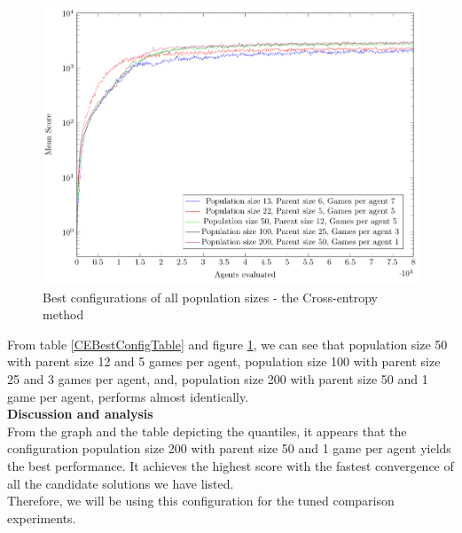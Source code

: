 \begin{figure}[H]
\centering
\includegraphics[scale=0.8]{data/ce_population_offspring/bestofall_population/PlotFile.pdf}
\caption{Best configurations of all population sizes - the Cross-entropy method \label{CEBestConfigPlot}}
\end{figure}

From table \ref{CEBestConfigTable} and figure \ref{CEBestConfigPlot}, we can see that population size 50 with parent size 12 and 5 games per agent, population size 100 with parent size 25 and 3 games per agent, and, population size 200 with parent size 50 and 1 game per agent, performs almost identically.\\

\textbf{Discussion and analysis}\\
From the graph and the table depicting the quantiles, it appears that the configuration
population size 200 with parent size 50 and 1 game per agent yields the best performance. 
It achieves the highest score with the fastest convergence of all the candidate solutions
we have listed.\\
Therefore, we will be using this configuration for the tuned comparison experiments.

